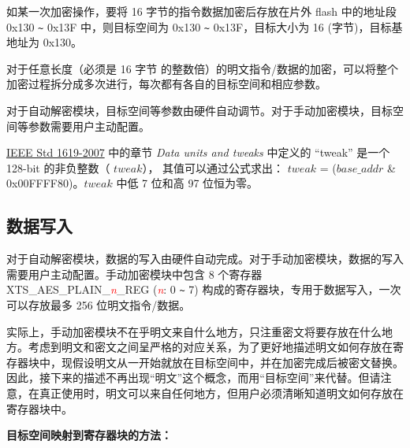\documentclass[main\_\_CN.tex]{subfiles}
\begin{document}
如某一次加密操作，要将 16 字节的指令数据加密后存放在片外 flash 中的地址段 0x130 \verb+~+ 0x13F 中，则目标空间为 0x130 \verb+~+ 0x13F，目标大小为 16 (字节)，目标基地址为 0x130。

对于任意长度（必须是 16 字节 的整数倍）的明文指令/数据的加密，可以将整个加密过程拆分成多次进行，每次都有各自的目标空间和相应参数。

对于自动解密模块，目标空间等参数由硬件自动调节。对于手动加密模块，目标空间等参数需要用户主动配置。

\begin{tiplisting}
\vspace{-2em}
\begin{enumerate}
     \href{https://ieeexplore.ieee.org/document/4493450}{IEEE Std 1619-2007} 中的章节 \textit{Data units and tweaks} 中定义的 “tweak”  是一个 128-bit 的非负整数（ \begin{math} tweak \end{math}），
    其值可以通过公式求出： \begin{math} tweak \end{math} = (\begin{math} base\_addr \end{math} \& 0x00FFFF80)。\begin{math} tweak \end{math} 中低 7 位和高 97 位恒为零。
\end{enumerate}
\end{tiplisting}

\subsection{数据写入} 
\label{sec:extmemncr-data-writing}

对于自动解密模块，数据的写入由硬件自动完成。对于手动加密模块，数据的写入需要用户主动配置。手动加密模块中包含 8 个寄存器 XTS\_AES\_PLAIN\_\textcolor{red}{\it{n}}\_REG (\textcolor{red}{\it{n}}: 0 \verb+~+ 7) 构成的寄存器块，专用于数据写入，一次可以存放最多 256 位明文指令/数据。

实际上，手动加密模块不在乎明文来自什么地方，只注重密文将要存放在什么地方。考虑到明文和密文之间呈严格的对应关系，为了更好地描述明文如何存放在寄存器块中，现假设明文从一开始就放在目标空间中，并在加密完成后被密文替换。因此，接下来的描述不再出现“明文”这个概念，而用“目标空间”来代替。但请注意，在真正使用时，明文可以来自任何地方，但用户必须清晰知道明文如何存放在寄存器块中。

{\bfseries 目标空间映射到寄存器块的方法：}
\end{document}
